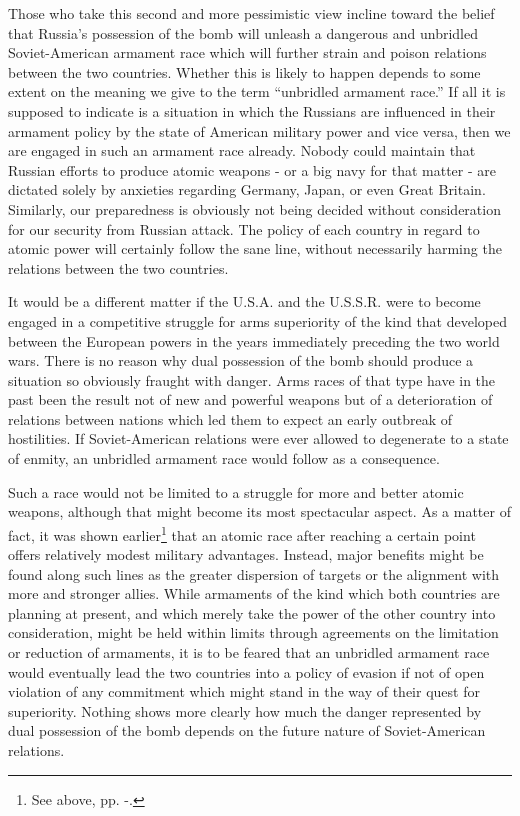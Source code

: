 Those who take this second and more pessimistic view incline toward the belief that Russia's possession of the bomb will unleash a dangerous and unbridled Soviet-American armament race which will further strain and poison relations between the two countries. Whether this is likely to happen depends to some extent on the meaning we give to the term ``unbridled armament race.'' If all it is supposed to indicate is a situation in which the Russians are influenced in their armament policy by the state of American military power and vice versa, then we are engaged in such an armament race already. Nobody could maintain that Russian efforts to produce atomic weapons - or a big navy for that matter - are dictated solely by anxieties regarding Germany, Japan, or even Great Britain. Similarly, our preparedness is obviously not being decided without consideration for our security from Russian attack. The policy of each country in regard to atomic power will certainly follow the sane line, without necessarily harming the relations between the two countries.

It would be a different matter if the U.S.A. and the U.S.S.R. were to become engaged in a competitive struggle for arms superiority of the kind that developed between the European powers in the years immediately preceding the two world wars. There is no reason why dual possession of the bomb should produce a situation so obviously fraught with danger. Arms races of that type have in the past been the result not of new and powerful weapons but of a deterioration of relations between nations which led them to expect an early outbreak of hostilities. If Soviet-American relations were ever allowed to degenerate to a state of enmity, an unbridled armament race would follow as a consequence.

Such a race would not be limited to a struggle for more and better atomic weapons, although that might become its most spectacular aspect. As a matter of fact, it was shown earlier\footnote{See above, pp. \pageref{I-SuperiorNos1}-\pageref{I-SuperiorNos2}.} that an atomic race after reaching a certain point offers relatively modest military advantages. Instead, major benefits might be found along such lines as the greater dispersion of targets or the alignment with more and stronger allies. While armaments of the kind which both countries are planning at present, and which merely take the power of the other country into consideration, might be held within limits through agreements on the limitation or reduction of armaments, it is to be feared that an unbridled armament race would eventually lead the two countries into a policy of evasion if not of open violation of any commitment which might stand in the way of their quest for superiority. Nothing shows more clearly how much the danger represented by dual possession of the bomb depends on the future nature of Soviet-American relations.

